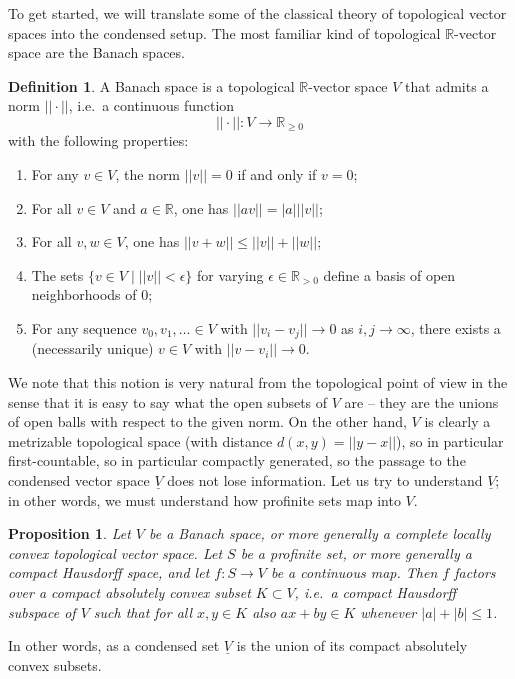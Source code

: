 \documentclass[11pt]{amsbook}
\numberwithin{equation}{section}
\numberwithin{theorem}{section}
\newtheorem{proposition}[theorem]{Proposition}
\theoremstyle{definition}
\newtheorem{definition}[theorem]{Definition}
\begin{document}
To get started, we will translate some of the classical theory of topological vector spaces into the condensed setup. The most familiar kind of topological $\mathbb R$-vector space are the Banach spaces.

\begin{definition} A Banach space is a topological $\mathbb R$-vector space $V$ that admits a norm $||\cdot||$, i.e.~a continuous function
\[
||\cdot||: V\to \mathbb R_{\geq 0}
\]
with the following properties:
\begin{enumerate}
\item For any $v\in V$, the norm $||v||=0$ if and only if $v=0$;
\item For all $v\in V$ and $a\in \mathbb R$, one has $||av|| = |a| ||v||$;
\item For all $v,w\in V$, one has $||v+w||\leq ||v||+||w||$;
\item The sets $\{v\in V\mid ||v||<\epsilon\}$ for varying $\epsilon\in \mathbb R_{>0}$ define a basis of open neighborhoods of $0$;
\item For any sequence $v_0,v_1,\ldots\in V$ with $||v_i-v_j||\to 0$ as $i,j\to\infty$, there exists a (necessarily unique) $v\in V$ with $||v-v_i||\to 0$.
\end{enumerate}
\end{definition}

We note that this notion is very natural from the topological point of view in the sense that it is easy to say what the open subsets of $V$ are -- they are the unions of open balls with respect to the given norm. On the other hand, $V$ is clearly a metrizable topological space (with distance $d(x,y) = ||y-x||$), so in particular first-countable, so in particular compactly generated, so the passage to the condensed vector space $\underline{V}$ does not lose information. Let us try to understand $\underline{V}$; in other words, we must understand how profinite sets map into $V$.

\begin{proposition} Let $V$ be a Banach space, or more generally a complete locally convex topological vector space. Let $S$ be a profinite set, or more generally a compact Hausdorff space, and let $f: S\to V$ be a continuous map. Then $f$ factors over a compact absolutely convex subset $K\subset V$, i.e.~a compact Hausdorff subspace of $V$ such that for all $x,y\in K$ also $ax+by\in K$ whenever $|a|+|b|\leq 1$.
\end{proposition}

In other words, as a condensed set $\underline{V}$ is the union of its compact absolutely convex subsets.
\end{document}
